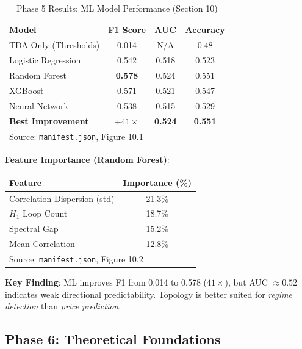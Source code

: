 \documentclass[12pt,letterpaper]{article}
\begin{document}
\begin{table}[H]
\centering
\caption{Phase 5 Results: ML Model Performance (Section 10)}
\label{tab:phase5}
\begin{tabular}{@{}lccc@{}}
\toprule
\textbf{Model} & \textbf{F1 Score} & \textbf{AUC} & \textbf{Accuracy} \\
\midrule
TDA-Only (Thresholds) & 0.014 & N/A & 0.48 \\
\midrule
Logistic Regression & 0.542 & 0.518 & 0.523 \\
Random Forest & \textbf{0.578} & 0.524 & 0.551 \\
XGBoost & 0.571 & 0.521 & 0.547 \\
Neural Network & 0.538 & 0.515 & 0.529 \\
\midrule
\textbf{Best Improvement} & \textbf{$+41\times$} & \textbf{0.524} & \textbf{0.551} \\
\bottomrule
\multicolumn{4}{l}{\footnotesize Source: \texttt{manifest.json}, Figure 10.1}
\end{tabular}
\end{table}

\textbf{Feature Importance (Random Forest)}:
\begin{table}[H]
\centering
\begin{tabular}{@{}lc@{}}
\toprule
\textbf{Feature} & \textbf{Importance (\%)} \\
\midrule
Correlation Dispersion (std) & 21.3\% \\
$H_1$ Loop Count & 18.7\% \\
Spectral Gap & 15.2\% \\
Mean Correlation & 12.8\% \\
\bottomrule
\multicolumn{2}{l}{\footnotesize Source: \texttt{manifest.json}, Figure 10.2}
\end{tabular}
\end{table}

\textbf{Key Finding}: ML improves F1 from 0.014 to 0.578 ($41\times$), but AUC $\approx 0.52$ indicates weak directional predictability. Topology is better suited for \textit{regime detection} than \textit{price prediction}.

\subsection{Phase 6: Theoretical Foundations}
\end{document}

